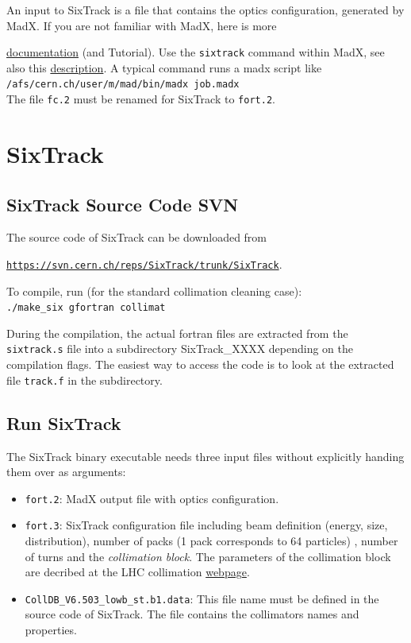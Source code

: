 \documentclass[a4paper, oneside, final]{scrartcl}
\begin{document}
An input to SixTrack is a file that contains the optics configuration, generated by MadX. If you are not familiar with MadX, here is more {\href{http://mad.web.cern.ch/mad/www/documentation.html}{documentation} (and Tutorial). Use the \texttt{sixtrack} command within MadX, see also this {\href{http://frs.home.cern.ch/frs/Xdoc/c6t/c6t.html}{description}}. A typical command runs a madx script like\\

\texttt{/afs/cern.ch/user/m/mad/bin/madx job.madx}\\

The file \texttt{fc.2} must be renamed for SixTrack to \texttt{fort.2}. 

\section{SixTrack}

\subsection{SixTrack Source Code SVN}

The source code of SixTrack can be downloaded from\\ {\href{https://svn.cern.ch/reps/SixTrack/trunk/SixTrack}{\texttt{https://svn.cern.ch/reps/SixTrack/trunk/SixTrack}}. \newline

To compile, run (for the standard collimation cleaning case):\\
\texttt{./make\_six gfortran collimat}\newline

During the compilation, the actual fortran files are extracted from the \texttt{sixtrack.s} file into a subdirectory SixTrack\_XXXX depending on the compilation flags. The easiest way to access the code is to look at the extracted file \texttt{track.f} in the subdirectory. 

\subsection{Run SixTrack}
The SixTrack binary executable needs three input files without explicitly handing them over as arguments:

\begin{itemize}
\item \texttt{fort.2}: MadX output file with optics configuration.
\item \texttt{fort.3}: SixTrack configuration file including beam definition (energy, size, distribution), number of packs (1 pack corresponds to 64 particles) , number of turns and the \textit{collimation block}. The parameters of the collimation block are decribed at the LHC collimation {\href{http://lhc-collimation-project.web.cern.ch/lhc-collimation-project/code-tracking-2012.php}{webpage}}.
\item \texttt{CollDB\_V6.503\_lowb\_st.b1.data}: This file name must be defined in the source code of SixTrack. The file contains the collimators names and properties.
\end{itemize}

}}
\end{document}
